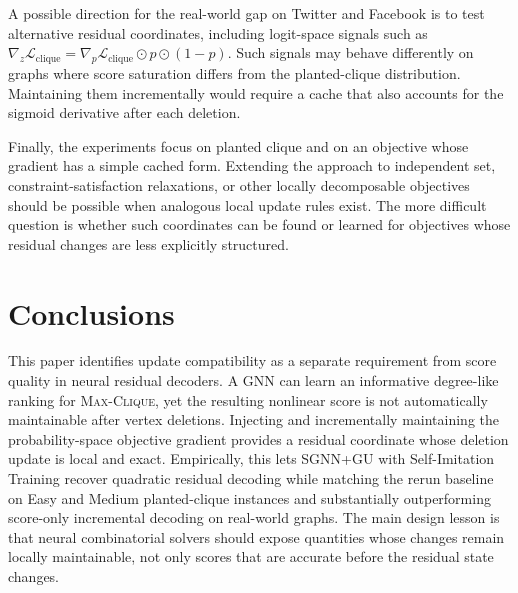 \documentclass[mathematics,article,submit,pdftex,moreauthors]{Definitions/mdpi}
\begin{document}
A possible direction for the real-world gap on Twitter and Facebook is to test
alternative residual coordinates, including logit-space signals such as
$\nabla_z \mathcal{L}_{\mathrm{clique}} =
\nabla_p \mathcal{L}_{\mathrm{clique}} \odot p \odot (1-p)$. Such signals may behave
differently on graphs where score saturation differs from the planted-clique
distribution. Maintaining them incrementally would require a cache that also accounts
for the sigmoid derivative after each deletion.

Finally, the experiments focus on planted clique and on an objective whose gradient
has a simple cached form. Extending the approach to independent set,
constraint-satisfaction relaxations, or other locally decomposable objectives should
be possible when analogous local update rules exist. The more difficult question is
whether such coordinates can be found or learned for objectives whose residual
changes are less explicitly structured.

\section{Conclusions}
\label{sec:conclusions}

This paper identifies update compatibility as a separate requirement from score
quality in neural residual decoders. A GNN can learn an informative degree-like
ranking for \textsc{Max-Clique}, yet the resulting nonlinear score is not
automatically maintainable after vertex deletions. Injecting and incrementally
maintaining the probability-space objective gradient provides a residual coordinate
whose deletion update is local and exact. Empirically, this lets \textsc{SGNN+GU}
with Self-Imitation Training recover quadratic residual decoding while matching the
rerun baseline on Easy and Medium planted-clique instances and substantially
outperforming score-only incremental decoding on real-world graphs. The main design
lesson is that neural combinatorial solvers should expose quantities whose changes
remain locally maintainable, not only scores that are accurate before the residual
state changes.


\end{document}
